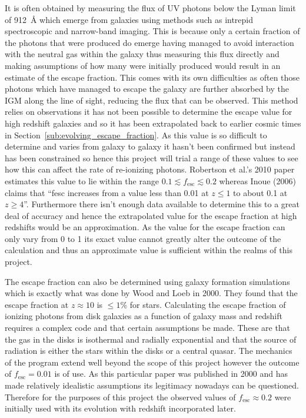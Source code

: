 			It is often obtained by measuring the flux of UV photons below the Lyman limit of \SI{912}{\angstrom} which emerge from galaxies using methods such as intrepid spectroscopic and narrow-band imaging\cite{robertson2010early}. This is because only a certain fraction of the photons that were produced do emerge having managed to avoid interaction with the neutral gas within the galaxy thus measuring this flux directly and making assumptions of how many were initially produced would result in an estimate of the escape fraction. This comes with its own difficulties as often those photons which have managed to escape the galaxy are further absorbed by the IGM along the line of sight, reducing the flux that can be observed. This method relies on observations it has not been possible to determine the escape value for high redshift galaxies and so it has been extrapolated back to earlier cosmic times in Section~\ref{sub:evolving_escape_fraction}. As this value is so difficult to determine and varies from galaxy to galaxy it hasn’t been confirmed but instead has been constrained so hence this project will trial a range of these values to see how this can affect the rate of re-ionizing photons. Robertson et al.'s 2010 paper estimates this value to lie within the range $0.1\lesssim f_\text{esc}\lesssim 0.2$\cite{robertson2010early} whereas Inoue (2006) claims that ``fesc increases from a value less than 0.01 at $z\le 1$ to about 0.1 at $z\ge 4$''\cite{inoue2006escape}. Furthermore there isn’t enough data available to determine this to a great deal of accuracy and hence the extrapolated value for the escape fraction at high redshifts would be an approximation. As the value for the escape fraction can only vary from 0 to 1 its exact value cannot greatly alter the outcome of the calculation and thus an approximate value is sufficient within the realms of this project.

			The escape fraction can also be determined using galaxy formation simulations which is exactly what was done by Wood and Loeb in 2000. They found that the escape fraction at $z\approx 10$ is $\le1$\% for stars\cite{gnedin2008escape}. Calculating the escape fraction of ionizing photons from disk galaxies as a function of galaxy mass and redshift requires a complex code and that certain assumptions be made. These are that the gas in the disks is isothermal and radially exponential and that the source of radiation is either the stars within the disks or a central quasar. The mechanics of the program extend well beyond the scope of this project however the outcome of $f_\text{esc}=0.01$ is of use. As this particular paper was published in 2000 and has made relatively idealistic assumptions its legitimacy nowadays can be questioned. Therefore for the purposes of this project the observed values of $f_\text{esc}\approx 0.2$ were initially used with its evolution with redshift incorporated later.


